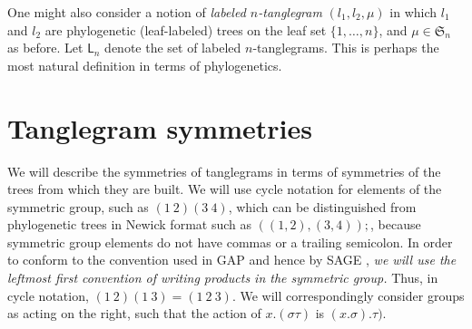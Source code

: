 \documentclass{amsart}
\newcommand{\fS}{\mathfrak S}
\newcommand{\pairing}{\mu}
\newcommand{\ltangle}{\mathsf{L}}
\begin{document}
One might also consider a notion of \emph{labeled $n$-tanglegram} $(l_1, l_2, \pairing)$ in which $l_1$ and $l_2$ are phylogenetic (leaf-labeled) trees on the leaf set $\{1, \ldots, n\}$, and $\pairing \in \fS_n$ as before.
Let $\ltangle_n$ denote the set of labeled $n$-tanglegrams.
This is perhaps the most natural definition in terms of phylogenetics.


\section{Tanglegram symmetries}
We will describe the symmetries of tanglegrams in terms of symmetries of the trees from which they are built.
We will use cycle notation for elements of the symmetric group, such as $(1\ 2) (3\ 4)$, which can be distinguished from phylogenetic trees in Newick format \cite{wiki:newick} such as $((1,2),(3,4));$, because symmetric group elements do not have commas or a trailing semicolon.
In order to conform to the convention used in GAP \cite{GAP4} and hence by SAGE \cite{SteinJoyner2005}, \emph{we will use the leftmost first convention of writing products in the symmetric group.}
Thus, in cycle notation, $(1\ 2) (1\ 3) = (1\ 2\ 3)$.
We will correspondingly consider groups as acting on the right, such that the action of $x.(\sigma \tau)$ is $(x.\sigma) . \tau)$.
\end{document}
